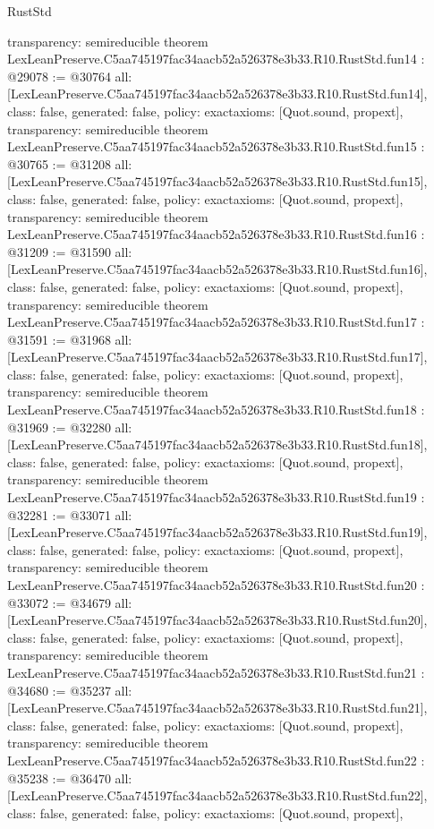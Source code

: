 \begin{lexlean}{RustStd}
\begin{coremodule}
{  transparency: semireducible
}
theorem LexLeanPreserve.C5aa745197fac34aacb52a526378e3b33.R10.RustStd.fun14 : @29078 := @30764 {
  all: [LexLeanPreserve.C5aa745197fac34aacb52a526378e3b33.R10.RustStd.fun14],
  class: false,
  generated: false,
  policy: exact{axioms: [Quot.sound, propext]},
  transparency: semireducible
}
theorem LexLeanPreserve.C5aa745197fac34aacb52a526378e3b33.R10.RustStd.fun15 : @30765 := @31208 {
  all: [LexLeanPreserve.C5aa745197fac34aacb52a526378e3b33.R10.RustStd.fun15],
  class: false,
  generated: false,
  policy: exact{axioms: [Quot.sound, propext]},
  transparency: semireducible
}
theorem LexLeanPreserve.C5aa745197fac34aacb52a526378e3b33.R10.RustStd.fun16 : @31209 := @31590 {
  all: [LexLeanPreserve.C5aa745197fac34aacb52a526378e3b33.R10.RustStd.fun16],
  class: false,
  generated: false,
  policy: exact{axioms: [Quot.sound, propext]},
  transparency: semireducible
}
theorem LexLeanPreserve.C5aa745197fac34aacb52a526378e3b33.R10.RustStd.fun17 : @31591 := @31968 {
  all: [LexLeanPreserve.C5aa745197fac34aacb52a526378e3b33.R10.RustStd.fun17],
  class: false,
  generated: false,
  policy: exact{axioms: [Quot.sound, propext]},
  transparency: semireducible
}
theorem LexLeanPreserve.C5aa745197fac34aacb52a526378e3b33.R10.RustStd.fun18 : @31969 := @32280 {
  all: [LexLeanPreserve.C5aa745197fac34aacb52a526378e3b33.R10.RustStd.fun18],
  class: false,
  generated: false,
  policy: exact{axioms: [Quot.sound, propext]},
  transparency: semireducible
}
theorem LexLeanPreserve.C5aa745197fac34aacb52a526378e3b33.R10.RustStd.fun19 : @32281 := @33071 {
  all: [LexLeanPreserve.C5aa745197fac34aacb52a526378e3b33.R10.RustStd.fun19],
  class: false,
  generated: false,
  policy: exact{axioms: [Quot.sound, propext]},
  transparency: semireducible
}
theorem LexLeanPreserve.C5aa745197fac34aacb52a526378e3b33.R10.RustStd.fun20 : @33072 := @34679 {
  all: [LexLeanPreserve.C5aa745197fac34aacb52a526378e3b33.R10.RustStd.fun20],
  class: false,
  generated: false,
  policy: exact{axioms: [Quot.sound, propext]},
  transparency: semireducible
}
theorem LexLeanPreserve.C5aa745197fac34aacb52a526378e3b33.R10.RustStd.fun21 : @34680 := @35237 {
  all: [LexLeanPreserve.C5aa745197fac34aacb52a526378e3b33.R10.RustStd.fun21],
  class: false,
  generated: false,
  policy: exact{axioms: [Quot.sound, propext]},
  transparency: semireducible
}
theorem LexLeanPreserve.C5aa745197fac34aacb52a526378e3b33.R10.RustStd.fun22 : @35238 := @36470 {
  all: [LexLeanPreserve.C5aa745197fac34aacb52a526378e3b33.R10.RustStd.fun22],
  class: false,
  generated: false,
  policy: exact{axioms: [Quot.sound, propext]},
}
\end{coremodule}
\end{lexlean}
